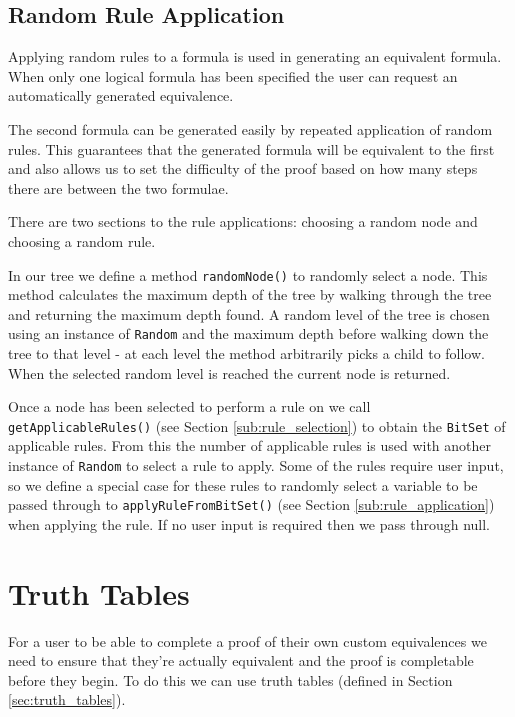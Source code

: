 \documentclass{report}
\begin{document}
\subsection{Random Rule Application}

Applying random rules to a formula is used in generating an equivalent formula. When only one logical formula has been specified the user can request an automatically generated equivalence.

The second formula can be generated easily by repeated application of random rules. This guarantees that the generated formula will be equivalent to the first and also allows us to set the difficulty of the proof based on how many steps there are between the two formulae.

There are two sections to the rule applications: choosing a random node and choosing a random rule. 

In our tree we define a method {\tt randomNode()} to randomly select a node. This method calculates the maximum depth of the tree by walking through the tree and returning the maximum depth found. A random level of the tree is chosen using an instance of {\tt Random} and the maximum depth before walking down the tree to that level - at each level the method arbitrarily picks a child to follow. When the selected random level is reached the current node is returned.

Once a node has been selected to perform a rule on we call {\tt getApplicableRules()} (see Section \ref{sub:rule_selection}) to obtain the {\tt BitSet} of applicable rules. From this the number of applicable rules is used with another instance of {\tt Random} to select a rule to apply. Some of the rules require user input, so we define a special case for these rules to randomly select a variable to be passed through to {\tt applyRuleFromBitSet()} (see Section \ref{sub:rule_application}) when applying the rule. If no user input is required then we pass through null.

\section{Truth Tables}
\label{sec:generating_truth_tables}

For a user to be able to complete a proof of their own custom equivalences we need to ensure that they're actually equivalent and the proof is completable before they begin. To do this we can use truth tables (defined in Section \ref{sec:truth_tables}).
\end{document}

